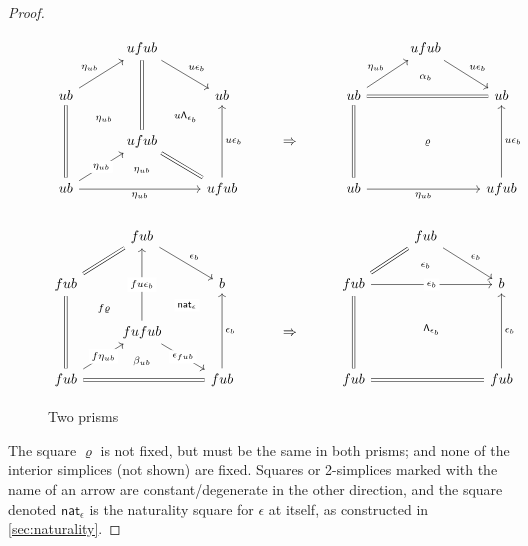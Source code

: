 \documentclass{amsart}
\theoremstyle{plain}
\theoremstyle{definition}
\theoremstyle{remark}
\numberwithin{equation}{section}
\newcommand{\connmin}[1]{\mathsf{\Lambda}_{#1}}
\begin{document}
\begin{proof}
  \begin{figure}
    \centering
    \[
  \begin{tikzcd}
    & ufub \ar[dr,"u\epsilon_b"] & & &     & ufub \ar[dr,"u\epsilon_b"] \ar[d,phantom,"\scriptstyle \alpha_b"]\\
    ub \ar[ur,"\eta_{ub}"] && ub & &     ub \ar[ur,"\eta_{ub}"] \ar[rr,equals] & ~ & ub\\
    & ufub \ar[dr,equals] \ar[uu,equals] \ar[ur,phantom,"\scriptstyle{u\connmin{\epsilon_b}}"] \ar[d,phantom,"\scriptstyle \eta_{ub}"]   & &  \Rightarrow  & & \\
    ub \ar[ur,"\eta_{ub}" description] \ar[rr,"\eta_{ub}"'] \ar[uu,equals] \ar[ruuu,phantom,"\scriptstyle\eta_{ub}"] &~& ufub\ar[uu,"u\epsilon_b"'] & & ub \ar[rr,"\eta_{ub}"'] \ar[uu,equals] \ar[rruu,phantom,"\scriptstyle \varrho"] && ufub\ar[uu,"u\epsilon_b"']\\    & fub \ar[dr,"\epsilon_b"] & & &     & fub \ar[dr,"\epsilon_b"] \ar[d,phantom,"\scriptstyle \epsilon_b"]\\
    fub \ar[ur,equals] && b & &     fub \ar[ur,equals] \ar[rr,"\epsilon_b" description] & ~ & b\\
    & fufub \ar[dr,"\epsilon_{fub}" description] \ar[uu,"fu\epsilon_b" description] \ar[ur,phantom,"\scriptstyle \mathsf{nat}_\epsilon" description] \ar[d,phantom,"\scriptstyle \beta_{ub}"] & & \Rightarrow & &\\
    fub \ar[ur,"f\eta_{ub}" description] \ar[rr,equals] \ar[uu,equals] \ar[ruuu,phantom,"\scriptstyle f\varrho"] &~& fub\ar[uu,"\epsilon_b"'] & & 
    fub \ar[rr,equals] \ar[uu,equals] \ar[rruu,phantom,"\scriptstyle \connmin{\epsilon_b}"] && fub\ar[uu,"\epsilon_b"']
  \end{tikzcd}
  \]
    \caption{Two prisms}
    \label{fig:two-prisms}
  \end{figure}
  The square $\varrho$ is not fixed, but must be the same in both prisms; and none of the interior simplices (not shown) are fixed.
  Squares or 2-simplices marked with the name of an arrow are constant/degenerate in the other direction, and the square denoted $\mathsf{nat}_\epsilon$ is the naturality square for $\epsilon$ at itself, as constructed in \cref{sec:naturality}.


\end{proof}
\end{document}
